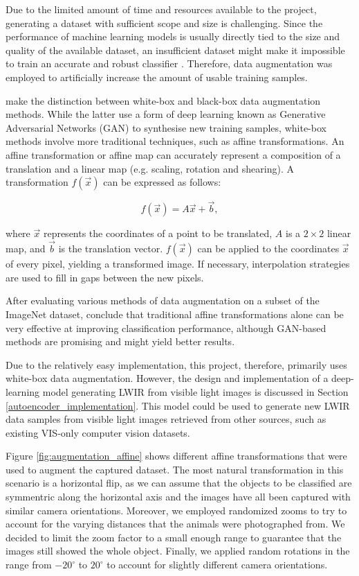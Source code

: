 \documentclass{l4proj}
\begin{document}
Due to the limited amount of time and resources available to the project, generating a dataset with sufficient scope and size is challenging. Since the performance of machine learning models is usually directly tied to the size and quality of the available dataset, an insufficient dataset might make it impossible to train an accurate and robust classifier \citep{fawzi_adaptive_2016}. Therefore, data augmentation was employed to artificially increase the amount of usable training samples.

\citet{mikolajczyk_data_2018} make the distinction between white-box and black-box data augmentation methods. While the latter use a form of deep learning known as Generative Adversarial Networks (GAN) to synthesise new training samples, white-box methods involve more traditional techniques, such as affine transformations. An affine transformation or affine map can accurately represent a composition of a translation and a linear map (e.g. scaling, rotation and shearing). A transformation $f(\vec{x})$ can be expressed as follows:

\begin{equation}
  f(\vec{x}) = A \vec{x} + \vec{b},
  \label{eqn:affine}
\end{equation}

where $\vec{x}$ represents the coordinates of a point to be translated, $A$ is a $2 \times 2$ linear map, and $\vec{b}$ is the translation vector. $f(\vec{x})$ can be applied to the coordinates $\vec{x}$ of every pixel, yielding a transformed image. If necessary, interpolation strategies are used to fill in gaps between the new pixels.

After evaluating various methods of data augmentation on a subset of the ImageNet dataset, \citet{perez_effectiveness_2017} conclude that traditional affine transformations alone can be very effective at improving classification performance, although GAN-based methods are promising and might yield better results.

Due to the relatively easy implementation, this project, therefore, primarily uses white-box data augmentation. However, the design and implementation of a deep-learning model generating LWIR from visible light images is discussed in Section \ref{autoencoder_implementation}. This model could be used to generate new LWIR data samples from visible light images retrieved from other sources, such as existing VIS-only computer vision datasets.

Figure \ref{fig:augmentation_affine} shows different affine transformations that were used to augment the captured dataset. The most natural transformation in this scenario is a horizontal flip, as we can assume that the objects to be classified are symmentric along the horizontal axis and the images have all been captured with similar camera orientations. Moreover, we employed randomized zooms to try to account for the varying distances that the animals were photographed from. We decided to limit the zoom factor to a small enough range to guarantee that the images still showed the whole object. Finally, we applied random rotations in the range from $-20^{\circ}$ to $20^{\circ}$ to account for slightly different camera orientations.
\end{document}
